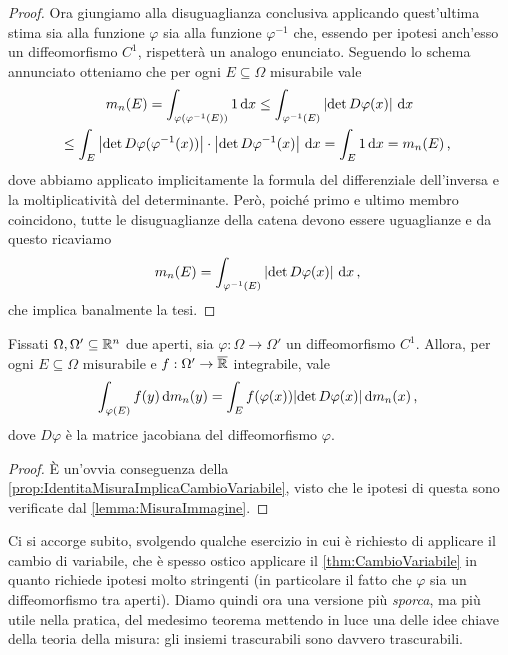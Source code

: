 \begin{proof}
	Ora giungiamo alla disuguaglianza conclusiva applicando quest'ultima stima sia alla funzione $\varphi$ sia alla funzione $\varphi^{-1}$ che, essendo per ipotesi anch'esso un diffeomorfismo $C^1$, rispetterà un analogo enunciato.
	Seguendo lo schema annunciato otteniamo che per ogni $E\subseteq\Omega$ misurabile vale
	\begin{multline*}
		m_n(E) =\int_{\varphi(\varphi^{-1}(E))}1\,\mathrm d x\le \int_{\varphi^{-1}(E)} \left\lvert\det D\varphi(x)\right\rvert\,\mathrm d x \\
 		\le \int_E \left\lvert\det D\varphi(\varphi^{-1}(x))\right\rvert \cdot \left\lvert\det D\varphi^{-1}(x)\right\rvert\,\mathrm d x =\int_E 1\,\mathrm d x=m_n(E) \, \text{, }
	\end{multline*}
	dove abbiamo applicato implicitamente la formula del differenziale dell'inversa e la moltiplicatività del determinante.
	Però, poiché primo e ultimo membro coincidono, tutte le disuguaglianze della catena devono essere uguaglianze e da questo ricaviamo
	\begin{equation*}
		m_n(E)=\int_{\varphi^{-1}(E)} \left\lvert\det D\varphi(x)\right\rvert\,\mathrm d x \, \text{, }
	\end{equation*}
	che implica banalmente la tesi.
\end{proof}

\begin{theorem}\label{thm:CambioVariabile}
	Fissati $\Omega,\Omega'\subseteq\mathbb R^n$ due aperti, sia $\varphi:\Omega\to\Omega'$ un diffeomorfismo $C^1$.
	Allora, per ogni $E\subseteq \Omega$ misurabile e $f:\Omega'\to\overline{\mathbb R}$ integrabile, vale
	\begin{equation*}
		\int_{\varphi(E)} f(y)\,\mathrm d m_n(y) = \int_{E} f(\varphi(x))\lvert \det D\varphi(x) \rvert \,\mathrm d m_n(x) \, \text{, }
	\end{equation*}
	dove $D\varphi$ è la matrice jacobiana del diffeomorfismo $\varphi$.
\end{theorem}
\begin{proof}
	È un'ovvia conseguenza della \cref{prop:IdentitaMisuraImplicaCambioVariabile}, visto che le ipotesi di questa sono verificate dal \cref{lemma:MisuraImmagine}.
\end{proof}

Ci si accorge subito, svolgendo qualche esercizio in cui è richiesto di applicare il cambio di variabile, che è spesso ostico applicare il \cref{thm:CambioVariabile} in quanto richiede ipotesi molto stringenti (in particolare il fatto che $\varphi$ sia un diffeomorfismo tra aperti). 
Diamo quindi ora una versione più \emph{sporca}, ma più utile nella pratica, del medesimo teorema mettendo in luce una delle idee chiave della teoria della misura: gli insiemi trascurabili sono davvero trascurabili.


